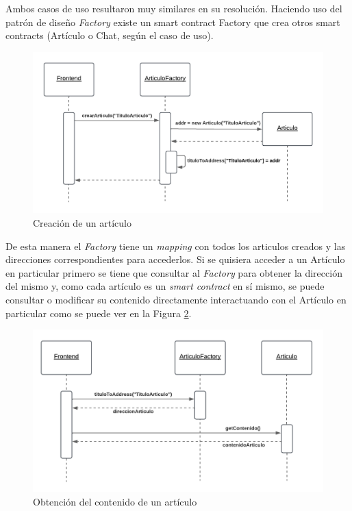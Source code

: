 Ambos casos de uso resultaron muy similares en su resolución. Haciendo uso del patrón de diseño \textit{Factory} existe un smart contract Factory que crea otros smart contracts (Artículo o Chat, según el caso de uso).

\begin{figure}[h]
    \centering
    \includegraphics[width=0.75\linewidth]{img/ds-aw-eth-crear-articulo.png}
    \caption{Creación de un artículo}
    \label{fig:ds-aw-eth-crear-articulo}
\end{figure}

De esta manera el \textit{Factory} tiene un \textit{mapping} con todos los articulos creados y las direcciones correspondientes para accederlos. Si se quisiera acceder a un Artículo en particular primero se tiene que consultar al \textit{Factory} para obtener la dirección del mismo y, como cada artículo es un \textit{smart contract} en sí mismo, se puede consultar o modificar su contenido directamente interactuando con el Artículo en particular como se puede ver en la Figura \ref{fig:ds-aw-eth-obtener-contenido-articulo}.

\begin{figure}[h]
    \centering
    \includegraphics[width=0.75\linewidth]{img/ds-aw-eth-obtener-contenido-articulo.png}
    \caption{Obtención del contenido de un artículo}
    \label{fig:ds-aw-eth-obtener-contenido-articulo}
\end{figure}

